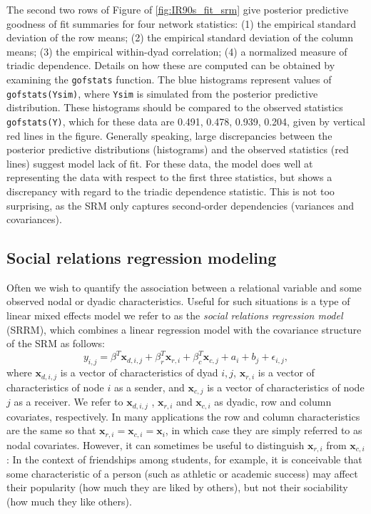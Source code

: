 \documentclass[11pt]{article}\usepackage[]{graphicx}\usepackage[]{color}
\newcommand{\bl}[1]{{\mathbf #1}}
\begin{document}
The second two rows of Figure of \ref{fig:IR90s_fit_srm}
 give posterior predictive
goodness of fit summaries for four network statistics:
(1) the empirical standard deviation of the row means;
(2) the empirical standard deviation of the column means;
(3) the empirical within-dyad  correlation;
(4)  a normalized measure of triadic dependence.
Details on how these are computed can be obtained by examining the
{\tt gofstats} function.
The blue histograms represent values of
{\tt gofstats(Ysim)}, where {\tt Ysim} is simulated from the
posterior predictive distribution. These histograms
should be compared to the observed statistics {\tt gofstats(Y)},
which for these data are
0.491, 0.478, 0.939, 0.204, given by vertical red lines in the figure.
Generally speaking,
large discrepancies between the posterior predictive distributions
(histograms) and the observed statistics (red lines) suggest
model lack of fit.
For these data, the model does well at representing the data 
with respect to the first three statistics, but shows a discrepancy with 
regard to 
the triadic dependence statistic. 
This is not too surprising, as the SRM only captures second-order 
dependencies (variances and covariances). 


\subsection{Social relations regression modeling}
Often we wish to quantify the association between  
a relational variable and  
some observed 
nodal or dyadic characteristics. 
Useful for such situations is a type of linear mixed effects 
model we refer to as the \emph{social relations regression model} (SRRM), 
which combines a linear regression model with the covariance 
structure of the SRM as follows:
\begin{equation}
 y_{i,j} = \beta^T \bl x_{d,i,j} + \beta_r^T \bl x_{r,i} +\beta_c^T \bl x_{c,j} +  a_i + b_j +  \epsilon_{i,j} ,  
\label{eqn:srrm}
\end{equation}
where $\bl x_{d,i,j}$ is a vector of characteristics of dyad $i,j$, 
    $\bl x_{r,i}$ is a vector of characteristics 
of node $i$ as  a sender, 
and $\bl x_{c,j}$ is a vector of characteristics of node $j$ 
as a receiver. 
We refer to $\bl x_{d,i,j}$ , $\bl x_{r,i}$ and $\bl x_{c,i}$ 
as dyadic, row and column covariates, respectively. 
In many applications the row and column 
characteristics are the same so that $\bl x_{r,i} = \bl x_{c,i} = \bl x_i $, 
in which case they are simply referred to as nodal covariates. 
However, it can sometimes be useful to distinguish $\bl x_{r,i}$ from $\bl x_{c,i}$:
In the context 
of friendships among students, for example, it is conceivable that some 
characteristic  of a person 
(such as athletic or academic success) 
may affect their popularity (how much they are liked  by others), 
but not their sociability (how much they like others). 
\end{document}
